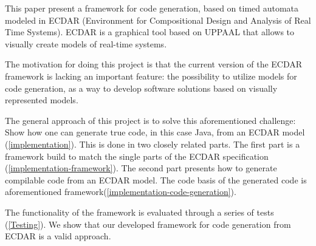 This paper present a framework for code generation, based on timed automata
modeled in ECDAR (Environment for Compositional Design and Analysis of Real Time
Systems). ECDAR is a graphical tool based on UPPAAL that allows to visually
create models of real-time systems.

The motivation for doing this project is that the current version of the ECDAR
framework is lacking an important feature: the possibility to utilize models for
code generation, as a way to develop software solutions based on visually
represented models.

The general approach of this project is to solve this aforementioned challenge:
Show how one can generate true code, in this case Java, from an ECDAR model
(\ref{implementation}). This is done in two closely related parts. The first
part is a framework build to match the single parts of the ECDAR specification
(\ref{implementation-framework}). The second part presents how to generate
compilable code from an ECDAR model. The code basis of the generated code is
aforementioned framework(\ref{implementation-code-generation}).

The functionality of the framework is evaluated through a series of tests
(\ref{Testing}). We show that our developed framework for code generation from
ECDAR is a valid approach.
